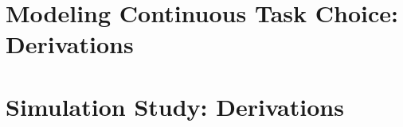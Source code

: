 \documentclass[12pt, a4paper, oneside, full]{article}
\begin{document}
\newpage
\printbibliography



\newpage
{} %
\begin{appendix}

\section{Modeling Continuous Task Choice: Derivations}





\section{Simulation Study: Derivations}


\end{appendix}
\end{document}

